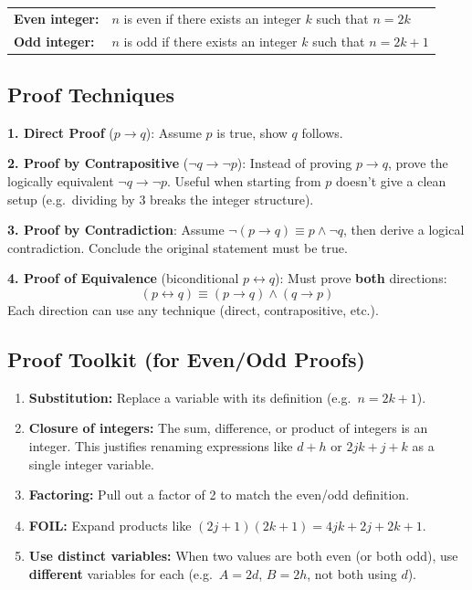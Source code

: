 \documentclass{article}
\begin{document}
\begin{tabular}{ll}
\textbf{Even integer:} & $n$ is even if there exists an integer $k$ such that $n = 2k$ \\
\textbf{Odd integer:} & $n$ is odd if there exists an integer $k$ such that $n = 2k + 1$
\end{tabular}

\subsection*{Proof Techniques}

\textbf{1. Direct Proof} ($p \to q$): Assume $p$ is true, show $q$ follows.

\medbreak
\textbf{2. Proof by Contrapositive} ($\neg q \to \neg p$): Instead of proving $p \to q$, prove the logically equivalent $\neg q \to \neg p$. Useful when starting from $p$ doesn't give a clean setup (e.g.\ dividing by 3 breaks the integer structure).

\medbreak
\textbf{3. Proof by Contradiction}: Assume $\neg(p \to q) \equiv p \land \neg q$, then derive a logical contradiction. Conclude the original statement must be true.

\medbreak
\textbf{4. Proof of Equivalence} (biconditional $p \leftrightarrow q$): Must prove \textbf{both} directions:
\[(p \leftrightarrow q) \equiv (p \to q) \land (q \to p)\]
Each direction can use any technique (direct, contrapositive, etc.).

\subsection*{Proof Toolkit (for Even/Odd Proofs)}

\begin{enumerate}[label=\arabic*.]
    \item \textbf{Substitution:} Replace a variable with its definition (e.g.\ $n = 2k+1$).
    \item \textbf{Closure of integers:} The sum, difference, or product of integers is an integer. This justifies renaming expressions like $d + h$ or $2jk + j + k$ as a single integer variable.
    \item \textbf{Factoring:} Pull out a factor of 2 to match the even/odd definition.
    \item \textbf{FOIL:} Expand products like $(2j+1)(2k+1) = 4jk + 2j + 2k + 1$.
    \item \textbf{Use distinct variables:} When two values are both even (or both odd), use \textbf{different} variables for each (e.g.\ $A = 2d$, $B = 2h$, not both using $d$).
\end{enumerate}
\end{document}
